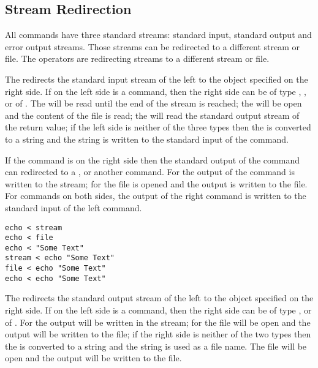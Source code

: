 \subsection{Stream Redirection}

All commands have three standard streams: standard input, standard output
and error output streams. Those streams can be redirected to a different stream
or file. The operators \code{<, >, <<, >>, |} are redirecting streams to a
different stream or file.

The \TheOperator{<} redirects the standard input stream of
the left to the object specified on the right side. If on the left side is
a command, then the right side can be of type \TypeStream, \TypeFile, \TypeReturnValue
or of \TypeGenericObject. The \TypeStream will be read until the end of the stream
is reached; the \TypeFile will be open and the content of the file is read;
the \TypeReturnValue will read the standard output stream of the return value;
if the left side is neither of the three types then the \TypeGenericObject is
converted to a string and the string is written to the standard input of the
command.

If the command is on the right side then the standard output of the command
can redirected to a \TypeStream, \TypeFile or another command. For \TypeStream
the output of the command is written to the stream; for \TypeFile the file
is opened and the output is written to the file.
For commands on both sides, the output of the right command is written to 
the standard input of the left command.

\begin{lstlisting}[style=Groovybash, label={lst:example_input_op}, caption={Example \OperatorName <}]
echo < stream
echo < file
echo < "Some Text"
stream < echo "Some Text"
file < echo "Some Text"
echo < echo "Some Text"
\end{lstlisting}

The \TheOperator{>} redirects the standard output stream of
the left to the object specified on the right side. If on the left side is
a command, then the right side can be of type \TypeStream, \TypeFile
or of \TypeGenericObject. For \TypeStream the output will be written in the stream; 
for \TypeFile the file will be open and the output will be written to the file;
if the right side is neither of the two types then the \TypeGenericObject is
converted to a string and the string is used as a file name. The file will be
open and the output will be written to the file.

